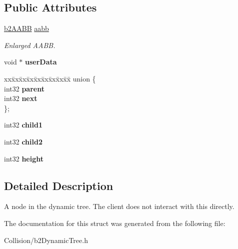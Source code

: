 \subsection*{Public Attributes}
\begin{DoxyCompactItemize}
\item 
\mbox{\label{structb2TreeNode_a798f1a594b33c713be45e76e79912239}} 
\mbox{\hyperlink{structb2AABB}{b2\+A\+A\+BB}} \mbox{\hyperlink{structb2TreeNode_a798f1a594b33c713be45e76e79912239}{aabb}}
\begin{DoxyCompactList}\small\item\em Enlarged A\+A\+BB. \end{DoxyCompactList}\item 
\mbox{\label{structb2TreeNode_aff77b3eb48326aca1b0762f5c45e56e7}} 
void $\ast$ {\bfseries user\+Data}
\item 
\mbox{\label{structb2TreeNode_a9d8975d1e109fb59c7f549f1da7d75c4}} 
\begin{tabbing}
xx\=xx\=xx\=xx\=xx\=xx\=xx\=xx\=xx\=\kill
union \{\\
\>int32 {\bfseries parent}\\
\>int32 {\bfseries next}\\
\}; \\

\end{tabbing}\item 
\mbox{\label{structb2TreeNode_a3a320f2afc7d223e92ee3629602be5ca}} 
int32 {\bfseries child1}
\item 
\mbox{\label{structb2TreeNode_aa6774ce329715b20d8b7cc8b6e3d50bc}} 
int32 {\bfseries child2}
\item 
\mbox{\label{structb2TreeNode_acd183ac94a8d44195c787111be4c22e2}} 
int32 {\bfseries height}
\end{DoxyCompactItemize}


\subsection{Detailed Description}
A node in the dynamic tree. The client does not interact with this directly. 

The documentation for this struct was generated from the following file\+:\begin{DoxyCompactItemize}
\item 
Collision/b2\+Dynamic\+Tree.\+h\end{DoxyCompactItemize}
